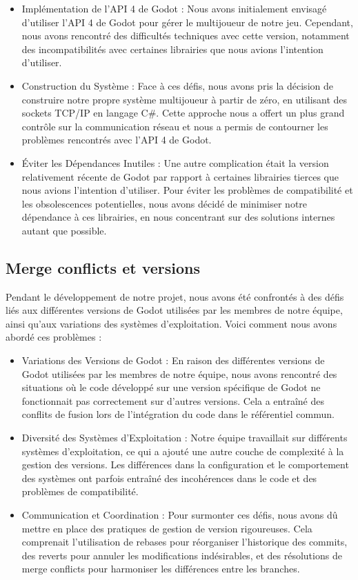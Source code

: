 \documentclass[
	article,			%
	11pt,				%
	oneside,			%
	a4paper,			%
	chapter=TITLE,
	french,			%
	sumario=tradicional
	]{base_nt}
\begin{document}
\begin{itemize}
    \item Implémentation de l'API 4 de Godot : Nous avons initialement envisagé d'utiliser l'API 4 de Godot pour gérer le multijoueur de notre jeu. Cependant, nous avons rencontré des difficultés techniques avec cette version, notamment des incompatibilités avec certaines librairies que nous avions l'intention d'utiliser.
    \item Construction du Système : Face à ces défis, nous avons pris la décision de construire notre propre système multijoueur à partir de zéro, en utilisant des sockets TCP/IP en langage C\#. Cette approche nous a offert un plus grand contrôle sur la communication réseau et nous a permis de contourner les problèmes rencontrés avec l'API 4 de Godot.
    \item Éviter les Dépendances Inutiles : Une autre complication était la version relativement récente de Godot par rapport à certaines librairies tierces que nous avions l'intention d'utiliser. Pour éviter les problèmes de compatibilité et les obsolescences potentielles, nous avons décidé de minimiser notre dépendance à ces librairies, en nous concentrant sur des solutions internes autant que possible.
\end{itemize}

\newpage

\subsection{Merge conflicts et versions}

Pendant le développement de notre projet, nous avons été confrontés à des défis liés aux différentes versions de Godot utilisées par les membres de notre équipe, ainsi qu'aux variations des systèmes d'exploitation. Voici comment nous avons abordé ces problèmes :

\begin{itemize}
    \item Variations des Versions de Godot : En raison des différentes versions de Godot utilisées par les membres de notre équipe, nous avons rencontré des situations où le code développé sur une version spécifique de Godot ne fonctionnait pas correctement sur d'autres versions. Cela a entraîné des conflits de fusion lors de l'intégration du code dans le référentiel commun.
    \item Diversité des Systèmes d'Exploitation : Notre équipe travaillait sur différents systèmes d'exploitation, ce qui a ajouté une autre couche de complexité à la gestion des versions. Les différences dans la configuration et le comportement des systèmes ont parfois entraîné des incohérences dans le code et des problèmes de compatibilité.
    \item Communication et Coordination : Pour surmonter ces défis, nous avons dû mettre en place des pratiques de gestion de version rigoureuses. Cela comprenait l'utilisation de rebases pour réorganiser l'historique des commits, des reverts pour annuler les modifications indésirables, et des résolutions de merge conflicts pour harmoniser les différences entre les branches.
\end{itemize}
\end{document}
